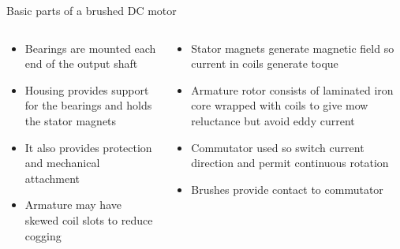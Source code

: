 \documentclass[compress]{beamer}
\begin{document}
\begin{frame}{Basic parts of a brushed DC motor}

\begin{columns}
    \footnotesize
    \begin{column}{0.5\linewidth}
    \begin{itemize}
        \item Bearings are mounted each end of the output shaft
        \item Housing provides support for the bearings and holds the stator magnets
        \item It also provides protection and mechanical attachment
        \item Armature may have skewed coil slots to reduce cogging
    \end{itemize}



    \end{column}
    \begin{column}{0.5\linewidth}
    \begin{itemize}
        \item Stator magnets generate magnetic field so current in coils generate
        toque
        \item Armature rotor consists of laminated iron core wrapped with coils to
        give mow reluctance but avoid eddy current
        \item Commutator used so switch current direction and permit continuous
        rotation
        \item Brushes provide contact to commutator
    \end{itemize}



\end{column}
\end{columns}
\end{frame}
\end{document}
